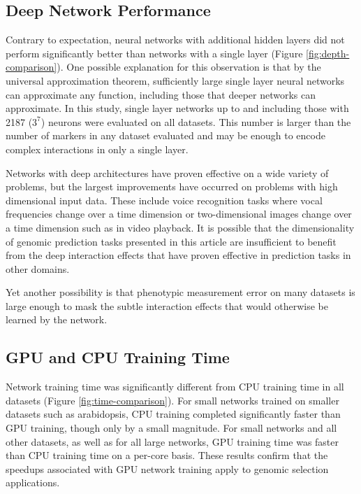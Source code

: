 \subsection*{Deep Network Performance}

Contrary to expectation, neural networks with additional hidden layers did not perform
significantly better than networks with a single layer (Figure \ref{fig:depth-comparison}). 
One possible explanation for this observation is that by the universal approximation theorem,
sufficiently large single layer neural networks can approximate any function, including those
that deeper networks can approximate. In this study, single layer networks up to and including
those with 2187 ($3^7$) neurons were evaluated on all datasets. This number is larger than the number
of markers in any dataset evaluated and may be enough to encode complex interactions in only a single
layer.

Networks with deep architectures have proven effective on a wide variety of problems, but the largest
improvements have occurred on problems with high dimensional input data. These include voice recognition 
tasks where vocal frequencies change over a time dimension or two-dimensional images change over 
a time dimension such as in video playback. It is possible that the dimensionality of genomic 
prediction tasks presented in this article are insufficient to benefit from the deep interaction 
effects that have proven effective in prediction tasks in other domains. 

Yet another possibility is that phenotypic measurement error on many datasets is large enough 
to mask the subtle interaction effects that would otherwise be learned by the network.

\ifdefined\showtablesandfigures
\fi

\subsection*{GPU and CPU Training Time}

Network training time was significantly different from CPU training time in all datasets 
(Figure \ref{fig:time-comparison}).  For small networks trained on smaller datasets 
such as arabidopsis, CPU training completed significantly faster than GPU training, 
though only by a small magnitude. For small networks and all other datasets, as well 
as for all large networks, GPU training time was faster than CPU training time on a 
per-core basis. These results confirm that the speedups associated 
with GPU network training apply to genomic selection applications.  


